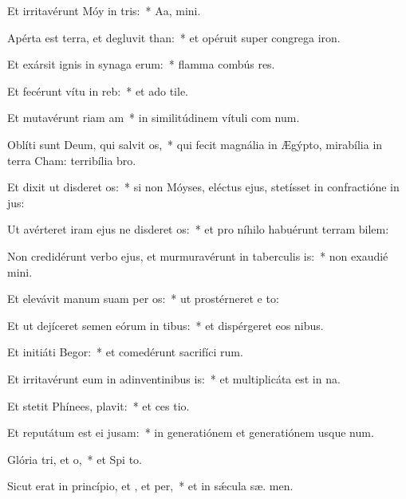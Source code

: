 \item Et irritavérunt Móy in tris:~* Aa,  mini.
\item Apérta est terra, et degluvit than:~* et opéruit super congrega iron.
\item Et exársit ignis in synaga erum:~* flamma combús res.
\item Et fecérunt vítu in reb:~* et ado tile.
\item Et mutavérunt riam am~* in similitúdinem vítuli com num.
\item Oblíti sunt Deum, qui salvit os,~* qui fecit magnália in Ægýpto, mirabília in terra Cham: terribília   bro.
\item Et dixit ut disderet os:~* si non Móyses, eléctus ejus, stetísset in confractióne in  jus:
\item Ut avérteret iram ejus ne disderet os:~* et pro níhilo habuérunt terram bilem:
\item Non credidérunt verbo ejus, et murmuravérunt in taberculis is:~* non exaudié  mini.
\item Et elevávit manum suam per os:~* ut prostérneret e  to:
\item Et ut dejíceret semen eórum in tibus:~* et dispérgeret eos  nibus.
\item Et initiáti  Begor:~* et comedérunt sacrifíci rum.
\item Et irritavérunt eum in adinventinibus is:~* et multiplicáta est in  na.
\item Et stetit Phínees,  plavit:~* et ces tio.
\item Et reputátum est ei  jusam:~* in generatiónem et generatiónem usque  num.
\item Glória tri, et o,~* et Spi to.
\item Sicut erat in princípio, et , et per,~* et in sǽcula sæ. men.
